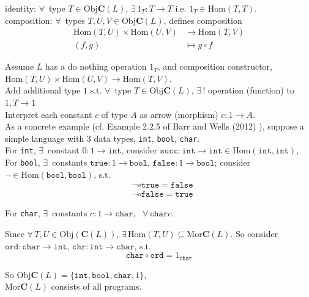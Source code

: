 \begin{itemize}
identity: $\forall \, $ type $T \in \text{Obj}\mathbf{C}(L)$, $\exists \, 1_T :T \to T$ i.e. $1_T \in \text{Hom}(T,T)$. \\

composition: $\forall \, $ types $T,U,V \in \text{Obj}\mathbf{C}(L)$, defines composition 
\[
\begin{aligned}
\text{Hom}(T,U) \times \text{Hom}(U,V) & \to \text{Hom}(T,V) \\ 
(f,g) & \mapsto g \circ f
\end{aligned}
\]

Assume $L$ has a do nothing operation $1_T$, and composition constructor, $\text{Hom}(T,U) \times \text{Hom}(U,V) \to \text{Hom}(T, V)$. \\

Add additional type $1$ s.t. $\forall \, $ type $T \in \text{Obj}\mathbf{C}(L)$, $\exists \, !$ operation (function) to $1, T \to 1$ \\
Interpret each constant $c$ of type $A$ as arrow (morphism) $c:1\to A$.  \\

As a concrete example (cf. Example 2.2.5 of Barr and Wells (2012) \cite{agat:BaWe2012}), suppose a simple language with 3 data types, \texttt{int}, \texttt{bool}, \texttt{char}. \\

For \texttt{int}, $\exists \, $ constant $0:1 \to \texttt{int}$, consider $\texttt{succ}:\texttt{int} \to \texttt{int} \in \text{Hom}(\texttt{int}, \texttt{int})$, \\
For \texttt{bool}, $\exists \, $ constants $\texttt{true} : 1 \to \texttt{bool}$, $\texttt{false} : 1 \to \texttt{bool}$; consider $\neg \in \text{Hom}(\texttt{bool}, \texttt{bool})$, s.t.
\[
\begin{aligned}
& \neg \circ \texttt{true} = \texttt{false} \\ 
& \neg \circ \texttt{false} = \texttt{true} 
\end{aligned}
\]

For \texttt{char}, $\exists \, $ constants $c:1 \to \texttt{char}$, \, $\forall \, \texttt{char} c$.

Since $\forall \, T,U \in \text{Obj}(\mathbf{C}(L))$, $\exists \, \text{Hom}(T,U) \subseteq \text{Mor}\mathbf{C}(L)$. So consider $\texttt{ord}:\texttt{char} \to \texttt{int}$, $\texttt{chr}: \texttt{int} \to \texttt{char}$, s.t. 
\[
\texttt{char} \circ \texttt{ord} = 1_{\texttt{char}}
\]

So $\text{Obj}\mathbf{C}(L) = \lbrace \texttt{int}, \texttt{bool}, \texttt{char}, 1 \rbrace$, \\
\phantom{So } $\text{Mor}\mathbf{C}(L)$ consists of all programs.


\end{itemize}
